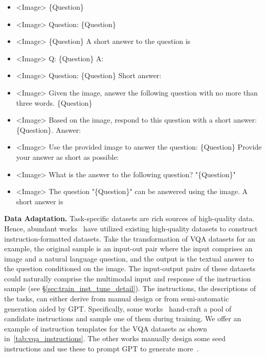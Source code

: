 \begin{table}[!htbp]
\begin{tcolorbox}
\centering
\small
\begin{itemize}[leftmargin=2.5mm]
\setlength{\itemsep}{1pt}
\item <Image> \{Question\}
\item <Image> Question: \{Question\}
\item <Image> \{Question\} A short answer to the question is
\item <Image> Q: \{Question\} A:
\item <Image> Question: \{Question\} Short answer:
\item <Image> Given the image, answer the following question with no more than three words. \{Question\}
\item <Image> Based on the image, respond to this question with a short answer: \{Question\}. Answer:
\item <Image> Use the provided image to answer the question: \{Question\} Provide your answer as short as possible:
\item <Image> What is the answer to the following question? "\{Question\}"
\item <Image> The question "\{Question\}" can be answered using the image. A short answer is
\end{itemize}
\end{tcolorbox}
\caption{Instruction templates for VQA datasets, cited from~\cite{instructblip}. <Image> and \{Question\} are the image and the question in the original VQA datasets, respectively.}
\label{tab:vqa_instructions}
\end{table}

\noindent \textbf{Data Adaptation.}
Task-specific datasets are rich sources of high-quality data. Hence, abundant works~\cite{instructblip, visionllm, x-llm, multiinstruct, llama-adapter, llama-adapter-v2, chatbridge, lavin} have utilized existing high-quality datasets to construct instruction-formatted datasets. Take the transformation of VQA datasets for an example, the original sample is an input-out pair where the input comprises an image and a natural language question, and the output is the textual answer to the question conditioned on the image. The input-output pairs of these datasets could naturally comprise the multimodal input and response of the instruction sample (see \S\ref{sec:train_inst_tune_detail}). The instructions, \ie the descriptions of the tasks, can either derive from manual design or from semi-automatic generation aided by GPT. Specifically, some works~\cite{instructblip, multiinstruct, minigpt-4, x-llm, llava-med, m3it} hand-craft a pool of candidate instructions and sample one of them during training. We offer an example of instruction templates for the VQA datasets as shown in~\cref{tab:vqa_instructions}. The other works manually design some seed instructions and use these to prompt GPT to generate more~\cite{visionllm, videochat, multimodal-gpt}. 

